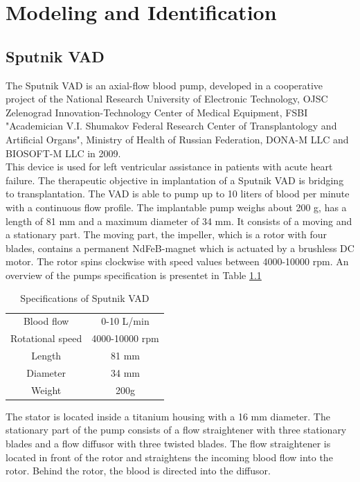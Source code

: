 \chapter{Modeling and Identification}
\section{Sputnik VAD}
The Sputnik VAD is an axial-flow blood pump, developed in a cooperative project of the National Research University of Electronic Technology, OJSC Zelenograd Innovation-Technology Center of Medical Equipment, FSBI "Academician V.I. Shumakov Federal Research Center of Transplantology and Artificial Organs", Ministry of Health of Russian Federation, DONA-M LLC and BIOSOFT-M LLC in 2009. \cite{Sputnik1}
\\This device is used for left ventricular assistance in patients with acute heart failure. The therapeutic objective in implantation of a Sputnik VAD is bridging to transplantation. The VAD is able to pump up to 10 liters of blood per minute with a continuous flow profile. The implantable pump weighs about 200 g, has a length of 81 mm and a maximum diameter of 34 mm. It consists of a moving and a stationary part. The moving part, the impeller, which is a rotor with four blades, contains a permanent NdFeB-magnet which is actuated by a brushless DC motor. The rotor spins clockwise with speed values between 4000-10000 rpm. An overview of the pumps specification is presentet in Table \ref{tab:sput1}
\begin{table}[h]
  \centering
  \begin{tabular}{c|c}
    \toprule
    Blood flow  & 0-10 L/min \\
    Rotational speed & 4000-10000 rpm \\
    Length & 81 mm \\
    Diameter & 34 mm \\
    Weight & 200g \\
    \bottomrule
\end{tabular}
  \caption{Specifications of Sputnik VAD}
  \label{tab:sput1}
\end{table}
The stator is located inside a titanium housing with a 16 mm diameter. The stationary part of the pump consists of a flow straightener with three stationary blades and a flow diffusor with three twisted blades. The flow straightener is located in front of the rotor and straightens the incoming blood flow into the rotor. Behind the rotor, the blood is directed into the diffusor. %
